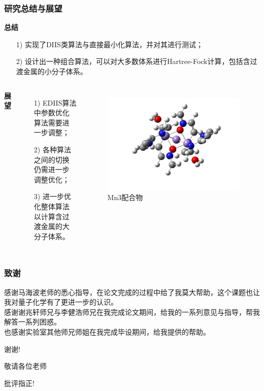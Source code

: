 \documentclass[10pt,aspectratio=43,mathserif,UTF8]{beamer}
\begin{document}
\begin{frame}
	\frametitle{研究总结与展望}
	\textbf{总结}
	\begin{itemize}
		\item[1)]
		 实现了DIIS类算法与直接最小化算法，并对其进行测试；
		\item[2)] 
		 设计出一种组合算法，可以对大多数体系进行Hartree-Fock计算，包括含过渡金属的小分子体系。
	\end{itemize}
	
	\begin{columns}[c]
		
		\textbf{展望}
		\begin{enumerate}
			\item [1)]
			EDIIS算法中参数优化算法需要进一步调整；
			\item [2)]
			各种算法之间的切换仍需进一步调整优化；
			\item [3)]
			进一步优化整体算法以计算含过渡金属的大分子体系。
		\end{enumerate}
	
		\begin{figure}[htbp]
			\centering
			\includegraphics[width=1.0\textwidth]{figure/HF/mn32.jpg}
			Mn3配合物
		\end{figure}
		
	\end{columns}

\end{frame}


\begin{frame}
	\frametitle{致谢}
	感谢马海波老师的悉心指导，在论文完成的过程中给了我莫大帮助，这个课题也让我对量子化学有了更进一步的认识。\\
	感谢谢兆轩师兄与李健浩师兄在我完成论文期间，给我的一系列意见与指导，帮我解答一系列困惑。\\
	也感谢实验室其他师兄师姐在我完成毕设期间，给我提供的帮助。
\end{frame}


\begin{frame}
	\Huge{\centerline{谢谢!}}
	\Huge{\centerline{敬请各位老师}}
	\Huge{\centerline{批评指正!}}
\end{frame}

\end{document}

